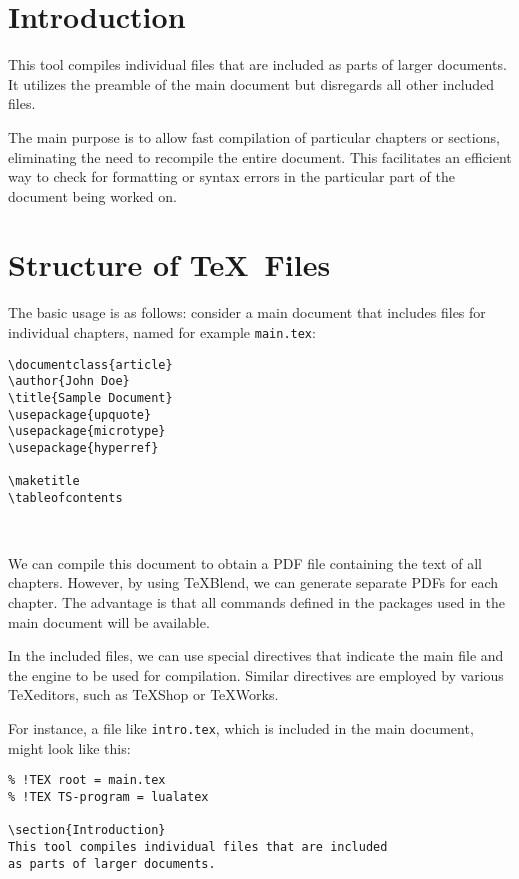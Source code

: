 
\section{Introduction}
This tool compiles individual files that are included as parts of larger documents. 
It utilizes the preamble of the main document but disregards all other included files.

The main purpose is to allow fast compilation of particular chapters or sections, 
eliminating the need to recompile the entire document.
This facilitates an efficient way to check for formatting or syntax errors in
the particular part of the document being worked on.

\section{Structure of \TeX\ Files}

The basic usage is as follows: consider a main document that includes files for
individual chapters, named for example \texttt{main.tex}:


\begin{verbatim}
\documentclass{article}
\author{John Doe}
\title{Sample Document}
\usepackage{upquote}
\usepackage{microtype}
\usepackage{hyperref}

\maketitle
\tableofcontents



\end{verbatim}

We can compile this document to obtain a PDF file containing the text of all
chapters. However, by using \TeX Blend, we can generate separate PDFs for each
chapter. The advantage is that all commands defined in the packages used in the
main document will be available.

In the included files, we can use special directives that indicate the main
file and the engine to be used for compilation. Similar directives are employed
by various \TeX editors, such as \TeX Shop or \TeX Works.

For instance, a file like \texttt{intro.tex}, which is included in the main document,
might look like this:

\begin{verbatim}
% !TEX root = main.tex
% !TEX TS-program = lualatex

\section{Introduction}
This tool compiles individual files that are included 
as parts of larger documents. 
\end{verbatim}

